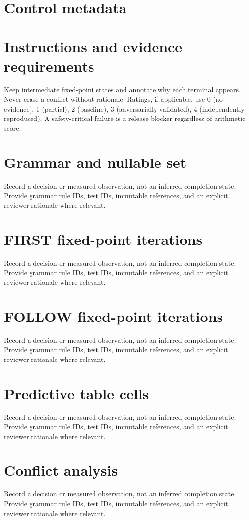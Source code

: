 \documentclass[11pt,letterpaper]{article}
\begin{document}
\makedoctitle\makedocsummary
\tableofcontents\clearpage
\section{Control metadata}
\section{Instructions and evidence requirements}
Keep intermediate fixed-point states and annotate why each terminal appears. Never erase a conflict without rationale. Ratings, if applicable, use 0 (no evidence), 1 (partial), 2 (baseline), 3 (adversarially validated), 4 (independently reproduced). A safety-critical failure is a release blocker regardless of arithmetic score.
\section{Grammar and nullable set}
Record a decision or measured observation, not an inferred completion state. Provide grammar rule IDs, test IDs, immutable references, and an explicit reviewer rationale where relevant.
\section{FIRST fixed-point iterations}
Record a decision or measured observation, not an inferred completion state. Provide grammar rule IDs, test IDs, immutable references, and an explicit reviewer rationale where relevant.
\section{FOLLOW fixed-point iterations}
Record a decision or measured observation, not an inferred completion state. Provide grammar rule IDs, test IDs, immutable references, and an explicit reviewer rationale where relevant.
\section{Predictive table cells}
Record a decision or measured observation, not an inferred completion state. Provide grammar rule IDs, test IDs, immutable references, and an explicit reviewer rationale where relevant.
\section{Conflict analysis}
Record a decision or measured observation, not an inferred completion state. Provide grammar rule IDs, test IDs, immutable references, and an explicit reviewer rationale where relevant.
\end{document}
